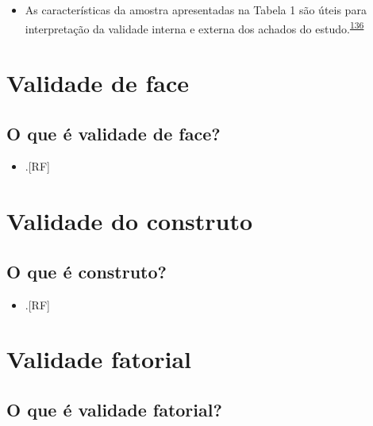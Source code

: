 \documentclass[
  a4paper,
]{book}
\providecommand{\tightlist}{%
  \setlength{\itemsep}{0pt}\setlength{\parskip}{0pt}}
\begin{document}
\begin{itemize}
\tightlist
\item
  As características da amostra apresentadas na Tabela 1 são úteis para interpretação da validade interna e externa dos achados do estudo.\textsuperscript{\protect\hyperlink{ref-Westreich2013}{136}}
\end{itemize}

\hypertarget{validade-face}{%
\section{Validade de face}\label{validade-face}}

\hypertarget{o-que-uxe9-validade-de-face}{%
\subsection{O que é validade de face?}\label{o-que-uxe9-validade-de-face}}

\begin{itemize}
\tightlist
\item
  .{[}RF{]}
\end{itemize}

\hypertarget{validade-constructo}{%
\section{Validade do construto}\label{validade-constructo}}

\hypertarget{o-que-uxe9-construto}{%
\subsection{O que é construto?}\label{o-que-uxe9-construto}}

\begin{itemize}
\tightlist
\item
  .{[}RF{]}
\end{itemize}

\hypertarget{validade-fatorial}{%
\section{Validade fatorial}\label{validade-fatorial}}

\hypertarget{o-que-uxe9-validade-fatorial}{%
\subsection{O que é validade fatorial?}\label{o-que-uxe9-validade-fatorial}}
\end{document}

